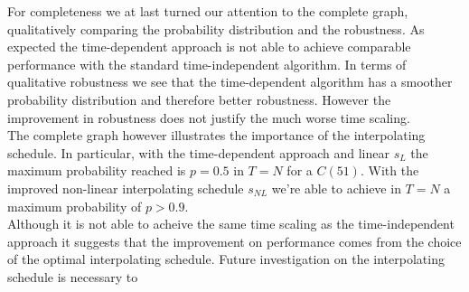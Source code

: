 For completeness we at last turned our attention to the complete graph, qualitatively comparing the probability distribution and the robustness. As expected the time-dependent approach is not able to achieve comparable performance with the standard time-independent algorithm.  In terms of qualitative robustness we see that the time-dependent algorithm has a smoother probability distribution and therefore better robustness. However the improvement in robustness does not justify the much worse time scaling. \\
The complete graph however illustrates the importance of the interpolating schedule. In particular, with the time-dependent approach and linear $s_L$ the maximum probability reached is $p=0.5$ in  $T=N$ for a $C(51)$. With the improved non-linear interpolating schedule $s_{NL}$ we're able to achieve in $T=N$ a maximum probability of $p>0.9$.\\


Although it is not able to acheive the same time scaling as the time-independent approach it suggests that the improvement on performance comes from the choice of the optimal interpolating schedule. Future investigation on the interpolating schedule is necessary to 
